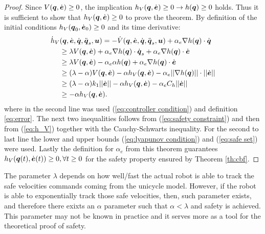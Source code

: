 \begin{proof}
    Since $V({\boldsymbol{q}},\dot{\boldsymbol{e}}) \geq 0$, the implication $h_V({\boldsymbol{q}},\dot{\boldsymbol{e}}) \geq 0 \rightarrow h({\boldsymbol{q}}) \geq 0$ holds. Thus it is sufficient to show that $h_V({\boldsymbol{q}},\dot{\boldsymbol{e}}) \geq 0$ to prove the theorem. By definition of the initial conditions $h_V({\boldsymbol{q}}_0,\dot{\boldsymbol{e}}_0) \geq 0$ and its time derivative:
    \begin{equation*}
        \begin{split}
            \dot{h}_V&({\boldsymbol{q}},\dot{\boldsymbol{e}},\dot{{\boldsymbol{q}}},\ddot{{\boldsymbol{q}}}_s,\boldsymbol{u}) = -\dot{V}({\boldsymbol{q}},\dot{\boldsymbol{e}},\dot{{\boldsymbol{q}}},\ddot{{\boldsymbol{q}}}_s,\boldsymbol{u}) + \alpha_e \nabla h({\boldsymbol{q}})\cdot\dot{{\boldsymbol{q}}} \\
            & \geq \lambda V({\boldsymbol{q}},\dot{\boldsymbol{e}}) + \alpha_e \nabla h({\boldsymbol{q}})\cdot\dot{{\boldsymbol{q}}}_s + \alpha_e \nabla h({\boldsymbol{q}})\cdot\dot{\boldsymbol{e}} \\
            & \geq \lambda V({\boldsymbol{q}},\dot{\boldsymbol{e}})  - \alpha_e \alpha h({\boldsymbol{q}}) + \alpha_e \nabla h({\boldsymbol{q}})\cdot\dot{\boldsymbol{e}} \\
            & \geq (\lambda-\alpha) V({\boldsymbol{q}},\dot{\boldsymbol{e}})- \alpha h_V({\boldsymbol{q}},\dot{\boldsymbol{e}}) - \alpha_e ||\nabla h({\boldsymbol{q}})||\cdot||\dot{\boldsymbol{e}}||  \\
            & \geq (\lambda-\alpha) k_1 ||\dot{\boldsymbol{e}}|| - \alpha h_V({\boldsymbol{q}},\dot{\boldsymbol{e}}) - \alpha_e C_h ||\dot{\boldsymbol{e}}|| \\
            & \geq - \alpha h_V({\boldsymbol{q}},\dot{\boldsymbol{e}}).
        \end{split}
    \end{equation*}
    where in the second line was used (\ref{eq:controller condition}) and definition \eqref{eq:error}. The next two inequalities follows from (\ref{eq:safety constraint}) and then from (\ref{eq:h_V}) together with the Cauchy-Schwarts inequality. For the second to last line the lower and upper bounds (\ref{eq:lyapunov condition}) and (\ref{eq:safe set}) were used. Lastly the definition for $\alpha_e$ from this theorem guarantees $h_V({\boldsymbol{q}}(t),\dot{\boldsymbol{e}}(t)) \geq 0, \forall t \geq 0$ for the safety property ensured by Theorem \ref{th:cbf}.
\end{proof}
\noindent
The parameter $\lambda$ depends on how well/fast the actual robot is able to track the safe velocities commands coming from the unicycle model. However, if the robot is able to exponentially track those safe velocities, then, such parameter exists, and therefore there exixts an $\alpha$ parameter such that $\alpha <\lambda$ and safety is achieved. This parameter may not be known in practice and it serves more as a tool for the theoretical proof of safety.\\ 
